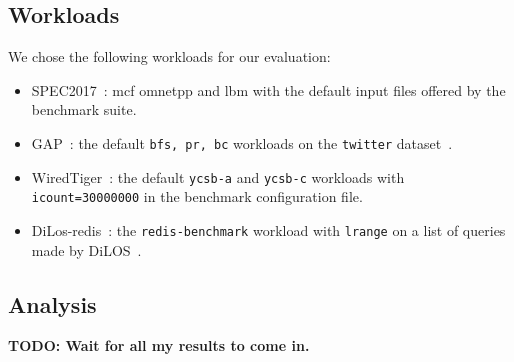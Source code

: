\subsection{Workloads}

We chose the following workloads for our evaluation:\begin{itemize}
    \item SPEC2017~\cite{SPEC2017}: mcf omnetpp and lbm with the default input files offered by the benchmark suite.
    \item GAP~\cite{gapbs}: the default \texttt{bfs, pr, bc} workloads on the \texttt{twitter} dataset~\cite{twitter-dataset}.
    \item WiredTiger~\cite{wiredtiger}: the default \texttt{ycsb-a} and \texttt{ycsb-c} workloads with \texttt{icount=30000000} in the benchmark configuration file.
    \item DiLos-redis~\cite{redis, DiLOS}: the \texttt{redis-benchmark} workload with \texttt{lrange} on a list of queries made by DiLOS~\cite{DiLOS}.
\end{itemize}

\subsection{Analysis}

\textbf{TODO: Wait for all my results to come in.}


